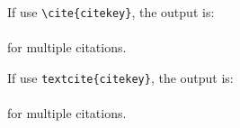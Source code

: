 \documentclass{article}
\begin{document}
If use \verb!\cite{citekey}!, the output is:\\ 
\cite{massa2022daplacer} \\
\cite{massa2022daplacer, massa2022daplacer} for multiple citations.

\vspace{1cm}

If use \verb!textcite{citekey}!, the output is:\\
\textcite{massa2022daplacer} \\
\textcite{massa2022daplacer,forti2022fogbrain} for multiple citations.

\printbibliography[heading=bibintoc]
\end{document}
